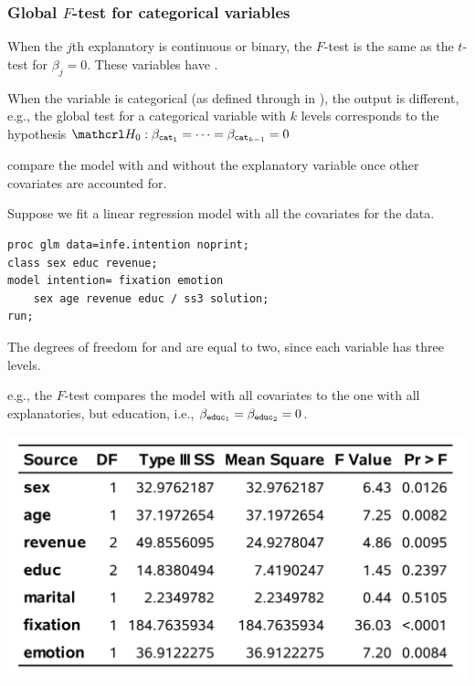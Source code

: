 \documentclass{beamer}
\begin{document}
\begin{frame}[fragile]
\frametitle{Global $F$-test for categorical variables}
\small 
\bi
\item When the $j$th explanatory is continuous or binary, the $F$-test is the \alert{same} as the $t$-test for $\beta_j=0$. These variables have .
\item When the variable is categorical (as defined through  in \SASlang), the output is different, e.g., the global test for a categorical variable  with $k$ levels corresponds to the hypothesis $\Hy_0: \beta_{\code{cat}_1}=\cdots = \beta_{\code{cat}_{k-1}}=0$
\bi \item compare the model with and without the explanatory variable once other covariates are accounted for.
\ei 
\ei 
\end{frame}
\begin{frame}[fragile]
Suppose we fit a linear regression model with all the covariates for the  data.
\begin{tcolorbox}[colback=white, colframe=hecblue, title=\SASlang code to fit the full linear model]
\begin{verbatim}
proc glm data=infe.intention noprint;
class sex educ revenue;
model intention= fixation emotion 
    sex age revenue educ / ss3 solution;
run;
\end{verbatim}
\end{tcolorbox}
\end{frame}
\begin{frame}

\bi \item 
The degrees of freedom for  and  are equal to two, since each variable has three levels.
\item e.g., the $F$-test compares the model with all covariates to the one with all explanatories, but education, i.e., $\beta_{\texttt{educ}_1} = \beta_{\texttt{educ}_2}=0$.
\ei
\begin{center}
\includegraphics[width = 0.7\linewidth]{img/c2/slides3-e10.png}
\end{center}

\end{frame}
\end{document}
